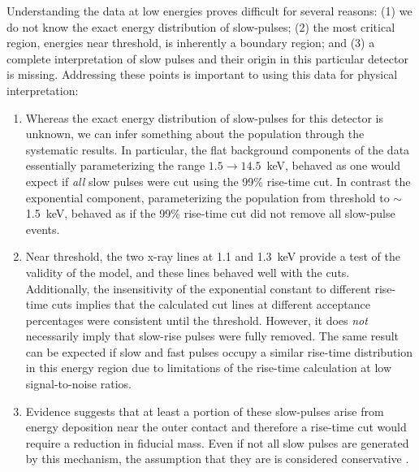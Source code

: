 	
	Understanding the data at low energies proves difficult for several reasons: (1) we do not know the exact energy distribution of slow-pulses; (2) the most critical region, energies near threshold, is inherently a boundary region; and (3) a complete interpretation of slow pulses and their origin in this particular detector is missing.  Addressing these points is important to using this data for physical interpretation:
	
	\begin{enumerate}
		\item Whereas the exact energy distribution of slow-pulses for this detector is unknown, we can infer something about the population through the systematic results.  In particular, the flat background components of the data essentially parameterizing the range $1.5\to14.5$~keV, behaved as one would expect if \emph{all} slow pulses were cut using the 99\% rise-time cut.  In contrast the exponential component, parameterizing the population from threshold to $\sim$1.5~keV, behaved as if the 99\% rise-time cut did not remove all slow-pulse events.  
		\item Near threshold, the two x-ray lines at 1.1 and 1.3~keV provide a test of the validity of the model, and these lines behaved well with the cuts.  Additionally, the insensitivity of the exponential constant to different rise-time cuts implies that the calculated cut lines at different acceptance percentages were consistent until the threshold.  However, it does \emph{not} necessarily imply that slow-rise pulses were fully removed.  The same result can be expected if slow and fast pulses occupy a similar rise-time distribution in this energy region due to limitations of the rise-time calculation at low signal-to-noise ratios.
		\item Evidence suggests that at least a portion of these slow-pulses arise from energy deposition near the outer contact
		and therefore a rise-time cut would require a reduction in fiducial mass.  Even if not all slow pulses are generated by this
		mechanism, the assumption that they are is considered conservative .  
	\end{enumerate}
	
